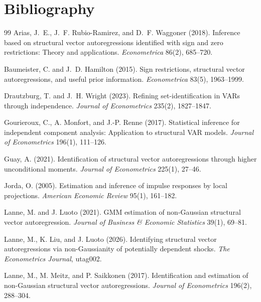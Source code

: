 \documentclass[11pt]{article}
\theoremstyle{definition}
\theoremstyle{plain}
\theoremstyle{remark}
\begin{document}
\section*{Bibliography}
\begin{thebibliography}{99}
Arias, J.~E., J.~F. Rubio-Ramirez, and D.~F. Waggoner (2018).
Inference based on structural vector autoregressions identified with sign and zero restrictions: Theory and applications.
\emph{Econometrica} 86(2), 685--720.

Baumeister, C. and J.~D. Hamilton (2015).
Sign restrictions, structural vector autoregressions, and useful prior information.
\emph{Econometrica} 83(5), 1963--1999.

Drautzburg, T. and J.~H. Wright (2023).
Refining set-identification in VARs through independence.
\emph{Journal of Econometrics} 235(2), 1827--1847.

Gourieroux, C., A. Monfort, and J.-P. Renne (2017).
Statistical inference for independent component analysis: Application to structural VAR models.
\emph{Journal of Econometrics} 196(1), 111--126.

Guay, A. (2021).
Identification of structural vector autoregressions through higher unconditional moments.
\emph{Journal of Econometrics} 225(1), 27--46.

Jorda, O. (2005).
Estimation and inference of impulse responses by local projections.
\emph{American Economic Review} 95(1), 161--182.

Lanne, M. and J. Luoto (2021).
GMM estimation of non-Gaussian structural vector autoregression.
\emph{Journal of Business \& Economic Statistics} 39(1), 69--81.

Lanne, M., K. Liu, and J. Luoto (2026).
Identifying structural vector autoregressions via non-Gaussianity of potentially dependent shocks.
\emph{The Econometrics Journal}, utag002.

Lanne, M., M. Meitz, and P. Saikkonen (2017).
Identification and estimation of non-Gaussian structural vector autoregressions.
\emph{Journal of Econometrics} 196(2), 288--304.


\end{thebibliography}
\end{document}
